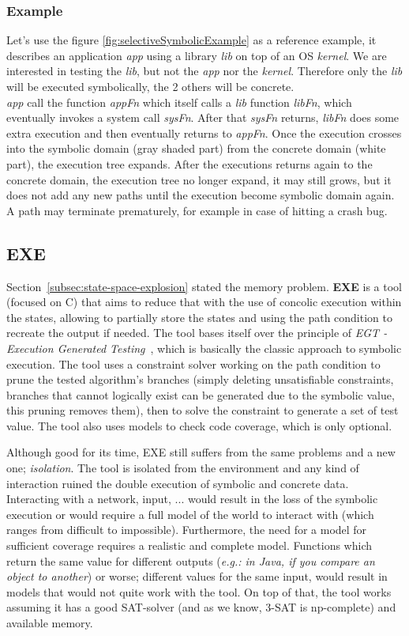 \documentclass[11pt]{IEEEtran}
\begin{document}
    	\subsubsection{Example}
    	\label{subsec:S2EExample}
    		Let's use the figure \ref{fig:selectiveSymbolicExample} as a reference example, it describes an application \emph{app} using a library \emph{lib} on top of an OS \emph{kernel}. We are interested in testing the \emph{lib}, but not the \emph{app} nor the \emph{kernel}. Therefore only the \emph{lib} will be executed symbolically, the 2 others will be concrete.\\

    		\emph{app} call the function \emph{appFn} which itself calls a \emph{lib} function \emph{libFn}, which eventually invokes a system call \emph{sysFn}. After that \emph{sysFn} returns, \emph{libFn} does some extra execution and then eventually returns to \emph{appFn}. Once the execution crosses into the symbolic domain (gray shaded part) from the concrete domain (white part), the execution tree expands. After the executions returns again to the concrete domain, the execution tree no longer expand, it may still grows, but it does not add any new paths until the execution become symbolic domain again. A path may terminate prematurely, for example in case of hitting a crash bug.


    \subsection{EXE}
      Section~\ref{subsec:state-space-explosion} stated the memory problem. \textbf{EXE} is a tool (focused on C) that aims to reduce that with the use of concolic execution within the states, allowing to partially store the states and using the path condition to recreate the output if needed. The tool bases itself over the principle of \emph{EGT - Execution Generated Testing}~\cite{exe}, which is basically the classic approach to symbolic execution. The tool uses a constraint solver working on the path condition to prune the tested algorithm's branches (simply deleting unsatisfiable constraints, branches that cannot logically exist can be generated due to the symbolic value, this pruning removes them), then to solve the constraint to generate a set of test value. The tool also uses models to check code coverage, which is only optional.

      Although good for its time, EXE still suffers from the same problems and a new one; \emph{isolation}. The tool is isolated from the environment and any kind of interaction ruined the double execution of symbolic and concrete data. Interacting with a network, input, ... would result in the loss of the symbolic execution or would require a full model of the world to interact with (which ranges from difficult to impossible). Furthermore, the need for a model for sufficient coverage requires a realistic and complete model. Functions which return the same value for different outputs (\emph{e.g.: in Java, if you compare an object to another}) or worse; different values for the same input, would result in models that would not quite work with the tool. On top of that, the tool works assuming it has a good SAT-solver (and as we know, 3-SAT is np-complete) and available memory.
\end{document}
